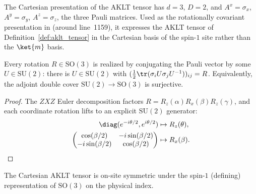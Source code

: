 \begin{definition}\label{def:aklt_cartesian}
    \leanok
    The Cartesian presentation of the AKLT tensor has $d = 3$, $D = 2$, and
    $A^x = \sigma_x$, $A^y = \sigma_y$, $A^z = \sigma_z$, the three Pauli
    matrices. Used as the rotationally covariant presentation in
    \cite{Cirac2021Matrix} (around line~1159), it expresses the AKLT tensor of
    Definition~\ref{def:aklt_tensor} in the Cartesian basis of the spin-$1$
    site rather than the $\ket{m}$ basis.
\end{definition}

\begin{lemma}\label{thm:su2_so3_surjective}
    \leanok
    Every rotation $R \in \mathrm{SO}(3)$ is realized by conjugating the Pauli
    vector by some $U \in \mathrm{SU}(2)$: there is $U \in \mathrm{SU}(2)$ with
    $(\tfrac12\tr(\sigma_i U\sigma_j U^{-1}))_{ij} = R$.
    Equivalently, the adjoint double cover
    $\mathrm{SU}(2) \to \mathrm{SO}(3)$ is surjective.
\end{lemma}
\begin{proof}
    \leanok
    The $ZXZ$ Euler decomposition factors $R = R_z(\alpha)R_x(\beta)R_z(\gamma)$,
    and each coordinate rotation lifts to an explicit $\mathrm{SU}(2)$ generator:
    \begin{align}
        \diag(e^{-i\theta/2},e^{i\theta/2})
         & \mapsto R_z(\theta), \notag \\
        \begin{pmatrix}
            \cos(\beta/2)   & -i\sin(\beta/2) \\
            -i\sin(\beta/2) & \cos(\beta/2)
        \end{pmatrix}
         & \mapsto R_x(\beta).
        \notag
    \end{align}
\end{proof}

\begin{lemma}\label{thm:aklt_so3_symmetric}
    \leanok
    The Cartesian AKLT tensor is on-site symmetric under the spin-$1$ (defining)
    representation of $\mathrm{SO}(3)$ on the physical index.
\end{lemma}

